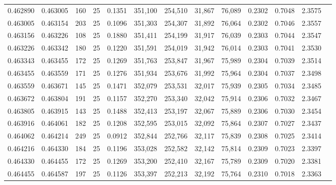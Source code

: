 \begin{tabular}{rrrrrrrrrrrrr}
0.462890 & 0.463005 &   160 &  25 &                                     0.1351 & 351,100 & 254,510 &  31,867 &  76,089 & 0.2302 & 0.7048 & 2.3575 \\
0.463005 & 0.463154 &   203 &  25 &                                     0.1096 & 351,303 & 254,307 &  31,892 &  76,064 & 0.2302 & 0.7046 & 2.3557 \\
0.463156 & 0.463226 &   108 &  25 &                                     0.1880 & 351,411 & 254,199 &  31,917 &  76,039 & 0.2303 & 0.7044 & 2.3547 \\
0.463226 & 0.463342 &   180 &  25 &                                     0.1220 & 351,591 & 254,019 &  31,942 &  76,014 & 0.2303 & 0.7041 & 2.3530 \\
0.463343 & 0.463455 &   172 &  25 &                                     0.1269 & 351,763 & 253,847 &  31,967 &  75,989 & 0.2304 & 0.7039 & 2.3514 \\
0.463455 & 0.463559 &   171 &  25 &                                     0.1276 & 351,934 & 253,676 &  31,992 &  75,964 & 0.2304 & 0.7037 & 2.3498 \\
0.463559 & 0.463671 &   145 &  25 &                                     0.1471 & 352,079 & 253,531 &  32,017 &  75,939 & 0.2305 & 0.7034 & 2.3485 \\
0.463672 & 0.463804 &   191 &  25 &                                     0.1157 & 352,270 & 253,340 &  32,042 &  75,914 & 0.2306 & 0.7032 & 2.3467 \\
0.463805 & 0.463915 &   143 &  25 &                                     0.1488 & 352,413 & 253,197 &  32,067 &  75,889 & 0.2306 & 0.7030 & 2.3454 \\
0.463916 & 0.464061 &   182 &  25 &                                     0.1208 & 352,595 & 253,015 &  32,092 &  75,864 & 0.2307 & 0.7027 & 2.3437 \\
0.464062 & 0.464214 &   249 &  25 &                                     0.0912 & 352,844 & 252,766 &  32,117 &  75,839 & 0.2308 & 0.7025 & 2.3414 \\
0.464216 & 0.464330 &   184 &  25 &                                     0.1196 & 353,028 & 252,582 &  32,142 &  75,814 & 0.2309 & 0.7023 & 2.3397 \\
0.464330 & 0.464455 &   172 &  25 &                                     0.1269 & 353,200 & 252,410 &  32,167 &  75,789 & 0.2309 & 0.7020 & 2.3381 \\
0.464455 & 0.464587 &   197 &  25 &                                     0.1126 & 353,397 & 252,213 &  32,192 &  75,764 & 0.2310 & 0.7018 & 2.3363 \\

\end{tabular}
